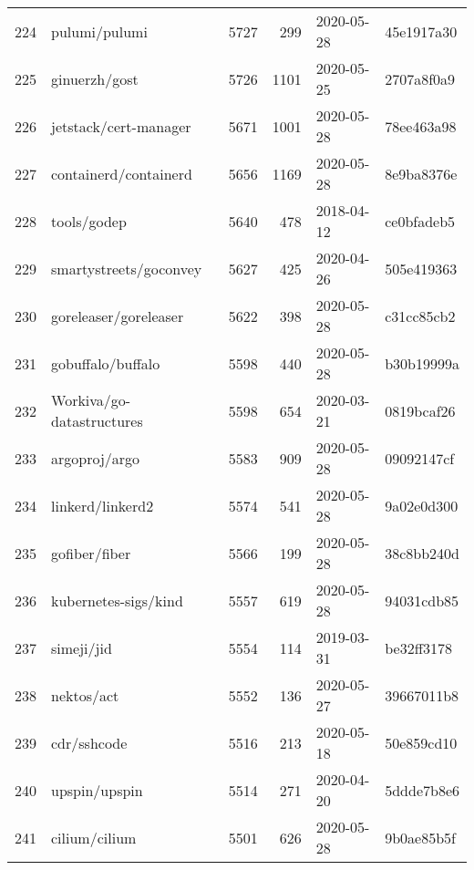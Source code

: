 \begin{longtable}{llrrll}
    224 &                                      pulumi/pulumi &   5727 &    299 & 2020-05-28 &  45e1917a30 \\
    225 &                                      ginuerzh/gost &   5726 &   1101 & 2020-05-25 &  2707a8f0a9 \\
    226 &                              jetstack/cert-manager &   5671 &   1001 & 2020-05-28 &  78ee463a98 \\
    227 &                              containerd/containerd &   5656 &   1169 & 2020-05-28 &  8e9ba8376e \\
    228 &                                        tools/godep &   5640 &    478 & 2018-04-12 &  ce0bfadeb5 \\
    229 &                             smartystreets/goconvey &   5627 &    425 & 2020-04-26 &  505e419363 \\
    230 &                              goreleaser/goreleaser &   5622 &    398 & 2020-05-28 &  c31cc85cb2 \\
    231 &                                  gobuffalo/buffalo &   5598 &    440 & 2020-05-28 &  b30b19999a \\
    232 &                          Workiva/go-datastructures &   5598 &    654 & 2020-03-21 &  0819bcaf26 \\
    233 &                                      argoproj/argo &   5583 &    909 & 2020-05-28 &  09092147cf \\
    234 &                                   linkerd/linkerd2 &   5574 &    541 & 2020-05-28 &  9a02e0d300 \\
    235 &                                      gofiber/fiber &   5566 &    199 & 2020-05-28 &  38c8bb240d \\
    236 &                               kubernetes-sigs/kind &   5557 &    619 & 2020-05-28 &  94031cdb85 \\
    237 &                                         simeji/jid &   5554 &    114 & 2019-03-31 &  be32ff3178 \\
    238 &                                         nektos/act &   5552 &    136 & 2020-05-27 &  39667011b8 \\
    239 &                                        cdr/sshcode &   5516 &    213 & 2020-05-18 &  50e859cd10 \\
    240 &                                      upspin/upspin &   5514 &    271 & 2020-04-20 &  5ddde7b8e6 \\
    241 &                                      cilium/cilium &   5501 &    626 & 2020-05-28 &  9b0ae85b5f \\

\end{longtable}
